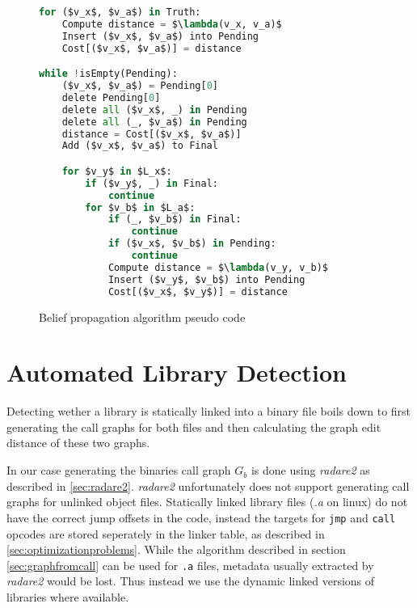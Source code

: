 \documentclass[
    12pt,                               %
    DIV=14,                     %
    parskip=half+,              %
    bigheadings,                %
    cleardoubleempty,   %
    halfparskip,                %
    ]{scrreprt} %
\begin{document}
\begin{figure}[H]
\begin{lstlisting}[language=Python,mathescape=true,tabsize=4]
for ($v_x$, $v_a$) in Truth:
	Compute distance = $\lambda(v_x, v_a)$
	Insert ($v_x$, $v_a$) into Pending
	Cost[($v_x$, $v_a$)] = distance

while !isEmpty(Pending):
	($v_x$, $v_a$) = Pending[0]
	delete Pending[0]
	delete all ($v_x$, _) in Pending
	delete all (_, $v_a$) in Pending
	distance = Cost[($v_x$, $v_a$)]
	Add ($v_x$, $v_a$) to Final

	for $v_y$ in $L_x$:
		if ($v_y$, _) in Final:
			continue
		for $v_b$ in $L_a$:
			if (_, $v_b$) in Final:
				continue
			if ($v_x$, $v_b$) in Pending:
				continue
			Compute distance = $\lambda(v_y, v_b)$
			Insert ($v_y$, $v_b$) into Pending
			Cost[($v_x$, $v_y$)] = distance

\end{lstlisting}
	\caption{Belief propagation algorithm pseudo code}
	\label{fig:graphmatching:propagation:code}
\end{figure}




\chapter{Automated Library Detection} \label{chap:libraryidentification}
Detecting wether a library is statically linked into a binary file boils down to first generating the call graphs for both files and then calculating the graph edit distance of these two graphs.

In our case generating the binaries call graph $G_b$ is done using \textit{radare2} as described in \ref{sec:radare2}. \textit{radare2} unfortunately does not support generating call graphs for unlinked object files. Statically linked library files (\textit{.a} on linux) do not have the correct jump offsets in the code, instead the targets for \verb'jmp' and \verb'call' opcodes are stored seperately in the linker table, as described in \ref{sec:optimizationproblems}. While the algorithm described in section \ref{sec:graphfromcall} can be used for \verb'.a' files, metadata usually extracted by \textit{radare2} would be lost. Thus instead we use the dynamic linked versions of libraries where available.
\end{document}
